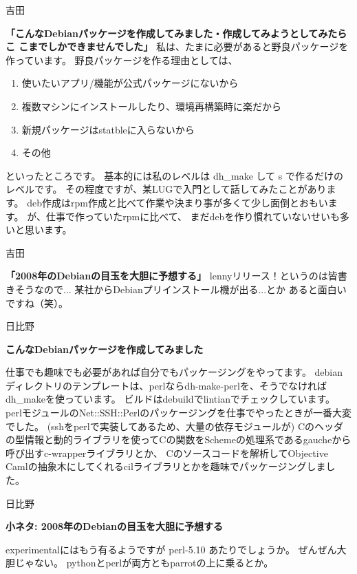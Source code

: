 \documentclass[cjk,dvipdfmx,12pt]{beamer}
\begin{document}
\begin{frame}{吉田}

\textbf{「こんなDebianパッケージを作成してみました・作成してみようとしてみたらこ
こまでしかできませんでした」}
私は、たまに必要があると野良パッケージを作っています。
野良パッケージを作る理由としては、
\begin{enumerate}
 \item 	 使いたいアプリ/機能が公式パッケージにないから
 \item	 複数マシンにインストールしたり、環境再構築時に楽だから
 \item	 新規パッケージはstatbleに入らないから
 \item	 その他
\end{enumerate}
といったところです。
基本的には私のレベルは dh\_make して s で作るだけのレベルです。
その程度ですが、某LUGで入門として話してみたことがあります。
deb作成はrpm作成と比べて作業や決まり事が多くて少し面倒とおもいます。
が、仕事で作っていたrpmに比べて、
まだdebを作り慣れていないせいも多いと思います。
\end{frame}\begin{frame}{吉田}

\textbf{「2008年のDebianの目玉を大胆に予想する」}
lennyリリース！というのは皆書きそうなので...
某社からDebianプリインストール機が出る...とか
あると面白いですね（笑）。

\end{frame}\begin{frame}{日比野}

\textbf{こんなDebianパッケージを作成してみました}

仕事でも趣味でも必要があれば自分でもパッケージングをやってます。
debianディレクトリのテンプレートは、perlならdh-make-perlを、そうでなければdh\_makeを使っています。
ビルドはdebuildでlintianでチェックしています。
perlモジュールのNet::SSH::Perlのパッケージングを仕事でやったときが一番大変でした。
(sshをperlで実装してあるため、大量の依存モジュールが)
Cのヘッダの型情報と動的ライブラリを使ってCの関数をSchemeの処理系であるgaucheから呼び出すc-wrapperライブラリとか、
Cのソースコードを解析してObjective Camlの抽象木にしてくれるcilライブラリとかを趣味でパッケージングしました。

\end{frame}\begin{frame}{日比野}

\textbf{小ネタ: 2008年のDebianの目玉を大胆に予想する}

experimentalにはもう有るようですが perl-5.10 あたりでしょうか。
ぜんぜん大胆じゃない。
pythonとperlが両方ともparrotの上に乗るとか。



\end{frame}
\end{document}
